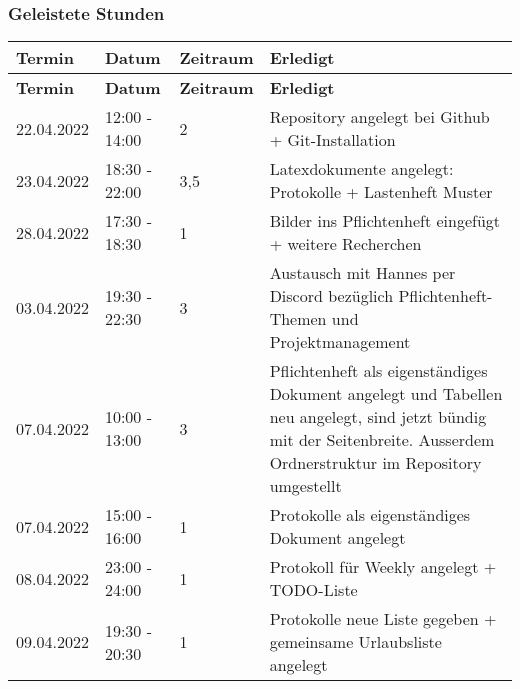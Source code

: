 \subsubsection{Geleistete Stunden}
\begin{flushleft}
		\begin{longtable}{p{2cm}p{}p{2cm}p{}}
            \toprule
            \textbf{Termin} & \textbf{Datum} & \textbf{Zeitraum} & \textbf{Erledigt}\\
            \midrule\endfirsthead
            \toprule
            \textbf{Termin} & \textbf{Datum} & \textbf{Zeitraum} & \textbf{Erledigt}\\
            \midrule\endhead
            	22.04.2022 & 12:00 - 14:00 & 2 & Repository angelegt bei Github +  Git-Installation\\ \midrule
    			23.04.2022 & 18:30 - 22:00 & 3,5 & Latexdokumente angelegt: Protokolle + Lastenheft Muster \\ \midrule
			    28.04.2022 & 17:30 - 18:30 & 1 & Bilder ins Pflichtenheft eingefügt + weitere Recherchen\\ \midrule
				03.04.2022 & 19:30 - 22:30 & 3 & Austausch mit Hannes per Discord bezüglich Pflichtenheft-Themen und Projektmanagement\\ \midrule
				07.04.2022 & 10:00 - 13:00 & 3 & Pflichtenheft als eigenständiges Dokument angelegt und Tabellen neu angelegt, sind jetzt bündig mit der Seitenbreite. Ausserdem Ordnerstruktur im Repository umgestellt\\ \midrule
				07.04.2022 & 15:00 - 16:00 & 1 & Protokolle als eigenständiges Dokument angelegt \\ \midrule
				08.04.2022 & 23:00 - 24:00 & 1 & Protokoll für Weekly angelegt + TODO-Liste \\ \midrule
				09.04.2022 & 19:30 - 20:30 & 1 & Protokolle neue Liste gegeben + gemeinsame Urlaubsliste angelegt \\ 
            \bottomrule
    \end{longtable}
\end{flushleft}